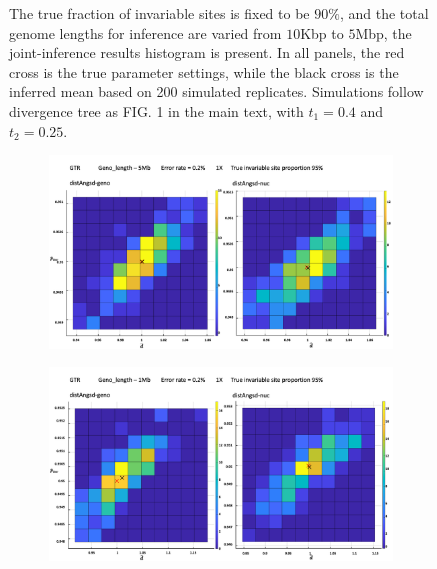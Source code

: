 \documentclass{article}
\begin{document}
\begin{figure}
\begin{subfigure}{.5\textwidth}
  \caption{}
  \label{fig:2D90s6}
\end{subfigure}
\caption{The true fraction of invariable sites is fixed to be $90\%$, and the total genome lengths for inference are varied from $10$Kbp to $5$Mbp, the joint-inference results histogram is present. In all panels, the red cross is the true parameter settings, while the black cross is the inferred mean based on 200 simulated replicates. Simulations follow divergence tree as FIG. 1 in the main text, with $t_1=0.4$ and $t_2 = 0.25$.}
\label{fig:2D90}
\end{figure}



\begin{figure}
\begin{subfigure}{.5\textwidth}
  \centering
  \includegraphics[width=.99\linewidth]{5M95.png}  
  \caption{}
  \label{fig:2D95s1}
\end{subfigure}
\begin{subfigure}{.5\textwidth}
  \centering
  \includegraphics[width=.99\linewidth]{1M95.png}  
  \caption{}
  \label{fig:2D95s2}

\end{subfigure}
\end{figure}
\end{document}
